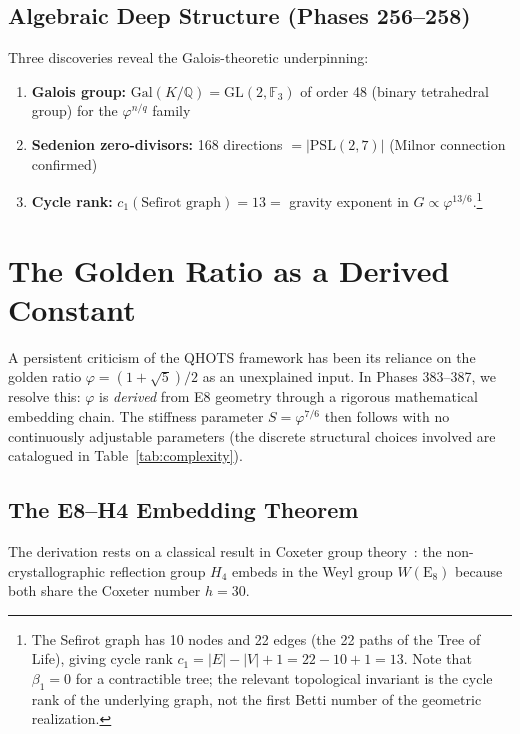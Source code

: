 \documentclass[aps,prd,twocolumn,superscriptaddress,floatfix,nofootinbib]{revtex4-2}
\theoremstyle{definition}
\theoremstyle{remark}
\newcommand{\vp}{\varphi}
\begin{document}
\subsection{Algebraic Deep Structure (Phases 256--258)}

Three discoveries reveal the Galois-theoretic underpinning:
\begin{enumerate}
\item \textbf{Galois group:} $\text{Gal}(K/\mathbb{Q}) = \text{GL}(2, \mathbb{F}_3)$ of order 48 (binary tetrahedral group) for the $\vp^{n/q}$ family
\item \textbf{Sedenion zero-divisors:} 168 directions $= |\text{PSL}(2,7)|$ (Milnor connection confirmed)
\item \textbf{Cycle rank:} $c_1(\text{Sefirot graph}) = 13 = $ gravity exponent in $G \propto \vp^{13/6}$.\footnote{The Sefirot graph has 10 nodes and 22 edges (the 22 paths of the Tree of Life), giving cycle rank $c_1 = |E| - |V| + 1 = 22 - 10 + 1 = 13$. Note that $\beta_1 = 0$ for a contractible tree; the relevant topological invariant is the cycle rank of the underlying graph, not the first Betti number of the geometric realization.}
\end{enumerate}


\section{The Golden Ratio as a Derived Constant}
\label{sec:phi-derived}

A persistent criticism of the QHOTS framework has been its reliance on the
golden ratio $\vp = (1+\sqrt{5})/2$ as an unexplained input. In Phases 383--387,
we resolve this: $\vp$ is \textit{derived} from E8 geometry through a rigorous
mathematical embedding chain. The stiffness parameter $S = \vp^{7/6}$ then follows
with no continuously adjustable parameters (the discrete structural
choices involved are catalogued in Table~\ref{tab:complexity}).

\subsection{The E8--H4 Embedding Theorem}

The derivation rests on a classical result in Coxeter group theory~\cite{coxeter}:
the non-crystallographic reflection group $H_4$ embeds in the Weyl group
$W(\text{E}_8)$ because both share the Coxeter number $h = 30$.
\end{document}
